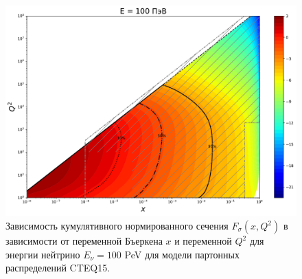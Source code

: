 \begin{figure}[!h]
\centering
\includegraphics[width=0.97\linewidth]{images/NuProp/cdfxq2_cc_proton_CT18ZNNLO_14_100000000.pdf}
\caption{Зависимость кумулятивного нормированного сечения $F_{\sigma}(x,Q^2)$ в зависимости от переменной Бъеркена $x$ и переменной $Q^2$ для энергии нейтрино $E_{\nu} = 100$ PeV для модели партонных распределений CTEQ15\cite{ncteq15}.}
\label{Pp8}
\end{figure}
